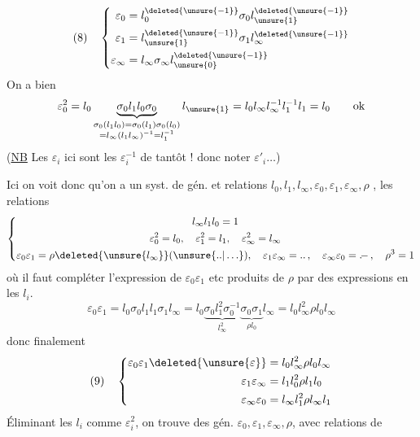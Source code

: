\[
(8)\quad\left\{\begin{aligned}
\varepsilon_0&=l_0^{\deleted{\unsure{-1}}}\sigma_0l_{\unsure{1}}^{\deleted{\unsure{-1}}}\\
\varepsilon_1&=l_{\unsure{1}}^{\deleted{\unsure{-1}}}\sigma_1l_\infty^{\deleted{\unsure{-1}}}\\
\varepsilon_\infty&=l_\infty\sigma_\infty l_{\unsure{0}}^{\deleted{\unsure{-1}}}
\end{aligned}\right.
\]
On a bien
\[
\varepsilon_0^2=l_0\underbrace{\sigma_0l_1l_0\sigma_0}_{\substack{\sigma_0(l_1l_0)=\sigma_0(l_1)\sigma_0(l_0)\\=l_\infty(l_1l_\infty)^{-1}=l_1^{-1}}}l_{\unsure{1}}=l_0l_\infty l_\infty^{-1}l_1^{-1}l_1=l_0\qquad\text{ok}
\]
(\uline{NB} Les $\varepsilon_i$ ici sont les $\varepsilon_i^{-1}$ de tantôt !    donc noter $\varepsilon'_i\ldots$)

Ici on voit donc qu'on a un syst. de gén. et relations  $l_0,l_1,l_\infty,\varepsilon_0,\varepsilon_1,\varepsilon_\infty,\rho$ , les relations
\[
\left\{\begin{gathered}
l_\infty l_1l_0=1\\
\varepsilon_0^2=l_0,\quad\varepsilon_1^2=l_1,\quad\varepsilon_\infty^2=l_\infty\\
\varepsilon_0\varepsilon_1=\rho\deleted{\unsure{l_\infty}}(\unsure{..|\ldots}),\quad\varepsilon_1\varepsilon_\infty=\mathinner{..},\quad\varepsilon_\infty\varepsilon_0=\mathinner{.\!-},\quad\rho^3=1
\end{gathered}\right.
\]
où il faut compléter l'expression de $\varepsilon_0\varepsilon_1$ etc  produits de $\rho$ par des expressions en les $l_i$.
\deleted{\[
\varepsilon_0\varepsilon_1=l_0\sigma_1l_1
\]}
\[
\varepsilon_0\varepsilon_1=l_0\sigma_0l_1l_1\sigma_1l_\infty
=l_0\underbrace{\sigma_0l_1^2\sigma_0^{-1}}_{l_\infty^2}\underbrace{\sigma_0\sigma_1}_{\rho l_0}l_\infty
=l_0l_\infty^2\rho l_0l_\infty
\]
donc finalement
\[
(9)\quad\left\{\begin{aligned}
\varepsilon_0\varepsilon_1\deleted{\unsure{\varepsilon}}&=l_0l_\infty^2\rho l_0l_\infty\\
\varepsilon_1\varepsilon_\infty&=l_1l_0^2\rho l_1l_0\\
\varepsilon_\infty\varepsilon_0&=l_\infty l_1^2\rho l_\infty l_1
\end{aligned}\right.
\]
Éliminant les $l_i$ comme $\varepsilon_i^2$, on trouve des gén. $\varepsilon_0,\varepsilon_1,\varepsilon_\infty,\rho$, avec relations de 

